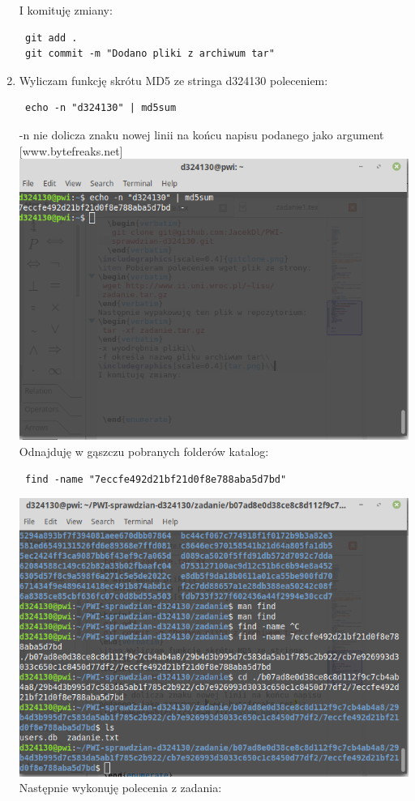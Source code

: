 \documentclass{article}
\begin{document}
\begin{enumerate}
I komituję zmiany:
\begin{verbatim}
 git add .
 git commit -m "Dodano pliki z archiwum tar"
\end{verbatim}
\item Wyliczam funkcję skrótu MD5 ze stringa d324130 poleceniem:
\begin{verbatim}
 echo -n "d324130" | md5sum
\end{verbatim}
-n nie dolicza znaku nowej linii na końcu napisu podanego jako argument [www.bytefreaks.net]\\
\includegraphics[scale=0.4]{md5sum.png}\\
Odnajduję w gąszczu pobranych folderów katalog:
\begin{verbatim}
 find -name "7eccfe492d21bf21d0f8e788aba5d7bd"
\end{verbatim}
\includegraphics[scale=0.4]{find.png}\\
Następnie wykonuję polecenia z zadania:


\end{enumerate}
\end{document}
